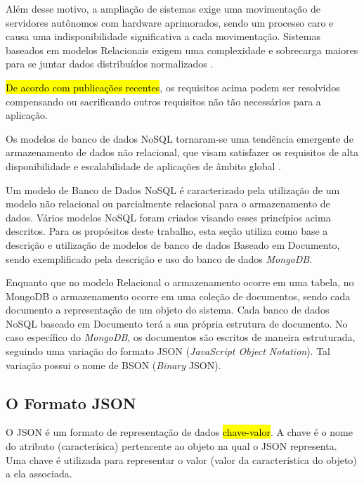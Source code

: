 Além desse motivo, a ampliação de sistemas exige uma movimentação de servidores autônomos com hardware aprimorados, sendo um processo caro e causa uma indisponibilidade significativa a cada movimentação. Sistemas baseados em modelos Relacionais exigem uma complexidade e sobrecarga maiores para se juntar dados distribuídos normalizados \cite{davoudian2018survey}.
    
\hl{De acordo com publicações recentes}, os requisitos acima podem ser resolvidos compensando ou sacrificando outros requisitos não tão necessários para a aplicação.

    
Os modelos de banco de dados NoSQL tornaram-se uma tendência emergente de armazenamento de dados não relacional, que visam satisfazer os requisitos de alta disponibilidade e escalabilidade de aplicações de âmbito global \cite{davoudian2018survey}.
    
Um modelo de Banco de Dados NoSQL é caracterizado pela utilização de um modelo não relacional ou parcialmente relacional para o armazenamento de dados. Vários modelos NoSQL foram criados visando esses princípios acima descritos. Para os propósitos deste trabalho, esta seção utiliza como base a descrição e utilização de modelos de banco de dados Baseado em Documento, sendo exemplificado pela descrição e uso do banco de dados \textit{MongoDB}.

Enquanto que no modelo Relacional o armazenamento ocorre em uma tabela, no MongoDB o armazenamento ocorre em uma coleção de documentos, sendo cada documento a representação de um objeto do sistema. Cada banco de dados NoSQL baseado em Documento terá a sua própria estrutura de documento. No caso específico do \textit{MongoDB}, os documentos são escritos de maneira estruturada, seguindo uma variação do formato JSON (\textit{JavaScript Object Notation}). Tal variação possui o nome de BSON (\textit{Binary} JSON).

\subsection{O Formato JSON}
    
O JSON é um formato de representação de dados \hl{chave-valor}. A chave é o nome do atributo (caracterísica) pertencente ao objeto na qual o JSON representa. Uma chave é utilizada para representar o valor (valor da característica do objeto) a ela associada.


